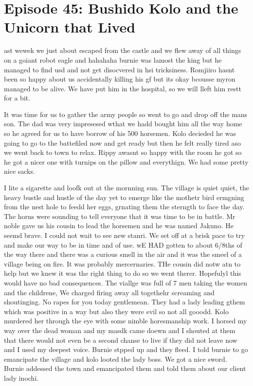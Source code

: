 \section{Episode 45: Bushido Kolo and the Unicorn that Lived}

\begin{multicols}{2}

ast wewek we just about escaped from the castle and we flew away of all things on a goiant robot eagle and hahahaha burnie was lamost the king but he managed to find usd and not get disocvered in hsi tricksiness. Romjiiro hasnt been so happy about us accidentally killing his gf but its okay bcousse myron managed to be alive. We have put him in the hospital, so we will lleft him restt for a bit.\medskip

It was time for us to gather the army people so went to go and drop off the mans son. The dad was very impresesed wthat we hadd bought him all the way home so he agreed for us to have borrow of his 500 horsemen. Kolo decieded he was going to go to the battefiled now and get ready but then he felt really tired aso we went back to town to relax. Rippy awasnt so happy with the room he got so he got a nicer one with turnips on the pillow and everythign. We had some pretty nice sacks.\medskip

I lite a sigarette and loofk out at the mornning sun. The village is quiet quiet, the heavy bustle and hustle of the day yet to emerge like the mothetr bird ermgning from the nest hole to feedd her eggs, grnating them the sterngth to face the day. The horns were sounding to tell everyone that it was time to be in battle. Mr noble gave us his cousin to lead the horsemen and he was named Jakuno. He seemd brave. I could not wait to see new stanri. We set off at a brisk pace to try and make our way to be in time and of use. wE HAD gotten to about 6/8ths of the way there and there was a curious smell in the air and it was the smeel of a village being on fire. It was probably mercernaries. THe cousin did notw atn to help but we knew it was the right thing to do so we went therer. Hopefulyl this would have no bad consequences. The viallge was full of 7 men taking the women and the childrene, We charged firing away all togethehr screaming and shoutinging. No rapes for you today gentlemean. They had a lady leading gthem which was positive in a way but also they were evil so not all gooodd. Kolo murdered her through the eye with some nimble horesmanship work. I horsed my way over the dead woman and my masdk came doewn and I shouted at them that there would not even be a second chanse to live if they did not leave now and I used my deepest voice. Burnie stpped up and they fleed. I told burnie to go emancipate the village and kolo looted the lady boss. We got a nice sword. Burnie addessed the town and emancipated them and told them about our client lady inochi.\medskip


\end{multicols}

